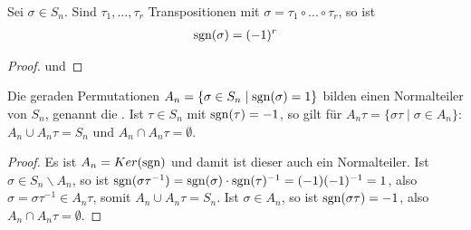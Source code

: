\begin{conclusion}
	Sei $\sigma\in S_n$. Sind $\tau_1,...,\tau_r$ Transpositionen mit $\sigma=\tau_1\circ ... \circ \tau_r$, so ist 
	\begin{align}
		\operatorname{sgn}(\sigma)=(-1)^r\notag
	\end{align}
\end{conclusion}
\begin{proof}
	 und 
\end{proof}

\begin{conclusion}
	Die geraden Permutationen $A_n=\{\sigma \in S_n \mid \operatorname{sgn}(\sigma)=1\}$ bilden einen Normalteiler von $S_n$, 
	genannt die . Ist $\tau\in S_n$ mit $\operatorname{sgn}(\tau)=-1$, so gilt für $A_n\tau=\{\sigma\tau \mid \sigma\in A_n\}$: 
	$A_n \cup A_n\tau = S_n$ und $A_n \cap A_n\tau=\emptyset$.
\end{conclusion}
\begin{proof}
	Es ist $A_n=Ker(\operatorname{sgn})$ und damit ist dieser auch ein Normalteiler. Ist $\sigma\in S_n\backslash A_n$, so ist $\operatorname{sgn}(\sigma\tau^{-1})=
	\operatorname{sgn}(\sigma)\cdot \operatorname{sgn}(\tau)^{-1}=(-1)(-1)^{-1}=1$, also $\sigma=\sigma\tau^{-1}\in A_n\tau$, somit $A_n\cup A_n\tau=S_n$. Ist 
	$\sigma\in A_n$, so ist $\operatorname{sgn}(\sigma\tau)=-1$, also $A_n\cap A_n\tau=\emptyset$.
\end{proof}